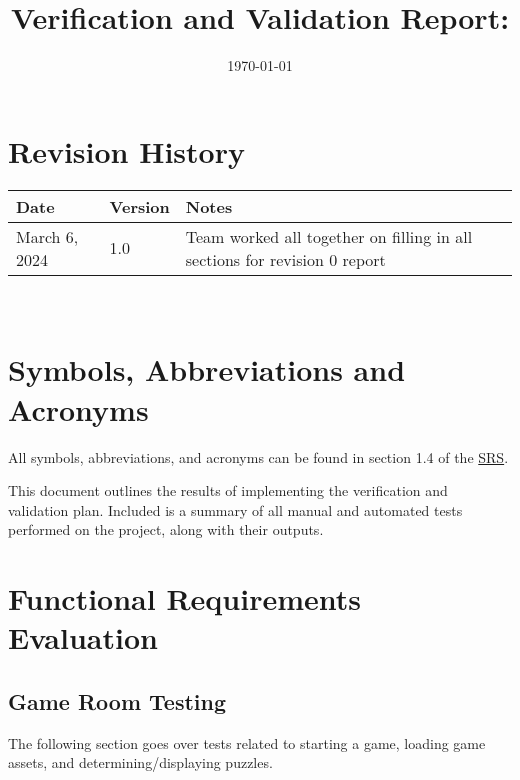 \documentclass[12pt, titlepage]{article}
\begin{document}
\title{Verification and Validation Report: \progname} 
\author{\authname}
\date{\today}
	
\maketitle


\section{Revision History}

\begin{tabularx}{\textwidth}{p{3cm}p{2cm}X}
\toprule {\bf Date} & {\bf Version} & {\bf Notes}\\
\midrule
March 6, 2024 & 1.0 & Team worked all together on filling in all sections for revision 0 report\\
\bottomrule
\end{tabularx}

~\newpage

\section{Symbols, Abbreviations and Acronyms}

\renewcommand{\arraystretch}{1.2}
All  symbols, abbreviations, and acronyms can be found in section 1.4 of the  \href{https://github.com/SammyG7/Mac-AR/blob/main/docs/SRS/SRS.pdf}{SRS}.


\newpage

\tableofcontents

\listoftables %

\listoffigures %

\newpage


This document outlines the results of implementing the verification and validation plan. Included is a summary of all manual and automated tests performed on the project, along with their outputs. 

\section{Functional Requirements Evaluation}

\subsection{Game Room Testing}
The following section goes over tests related to starting a game, loading game assets, and determining/displaying puzzles.
\end{document}
